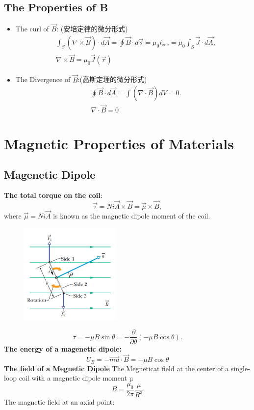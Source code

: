 \documentclass[11pt, a4paper]{article}
\begin{document}
\subsection{The Properties of B}
\begin{itemize}
    \item The curl of $\vec{B}$: (安培定律的微分形式) $$\begin{aligned}
        &\int_S(\nabla\times\vec{B})\cdot d\vec{A}=\oint\vec{B}\cdot d\vec{s}=\mu_0i_{\mathrm{enc}}=\mu_0\int_S\vec{J}\cdot d\vec{A},\\
        &\nabla\times\vec{B} = \mu_0 \vec{J}(\vec{r})
    \end{aligned}$$
    \item The Divergence of $\vec{B}$:(高斯定理的微分形式)$$\begin{aligned}
        &\oint\vec{B}\cdot d\vec{A}=\int(\nabla\cdot\vec{B})dV=0.\\
        & \nabla\cdot\vec{B} = 0
    \end{aligned}$$
\end{itemize}

\section{Magnetic Properties of Materials}
\subsection{Magenetic Dipole}
\textbf{The total torque on the coil}:
$$\vec{\tau}=Ni\vec{A}\times\vec{B}=\vec{\mu}\times\vec{B},$$
where $\vec{\mu} = Ni\vec{A}$ is known as the magnetic dipole
moment of the coil.

\begin{figure}[htbp]
    \centering
    \includegraphics[width = 5cm]{Megenetic Dipole.png}
\end{figure}

$$\tau=-\mu B\sin\theta=-\frac\partial{\partial\theta}(-\mu B\cos\theta).$$
\textbf{The energy of a magenetic dipole:}
$$U_B = -\vec{mu} \cdot \vec{B} = -\mu B \cos \theta$$
\textbf{The field of a Megnetic Dipole}
The Megneticat field at the center of a single-loop coil with a magnetic dipole moment $µ$
$$B = \frac{\mu_0}{2\pi}\frac{\mu}{R^3}$$
The magnetic field at an axial point:
\end{document}
